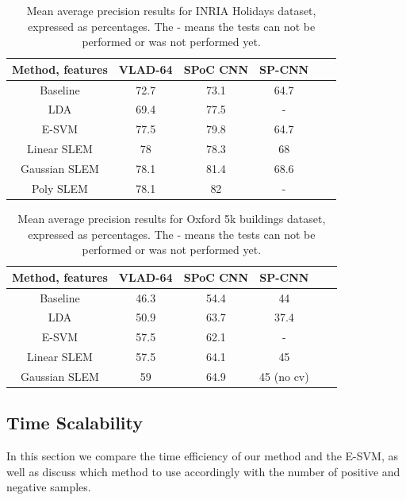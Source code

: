 \begin{table}[t]
\begin{center}
\begin{tabular}{|c|c|c|c|c|c|}
\hline
Method, features & VLAD-64 \cite{VLAD}& SPoC CNN \cite{babenko15} &  SP-CNN \cite{SPPCNN} \\
\hline\hline
Baseline            & 72.7  & 73.1 & 64.7\\
LDA                 & 69.4 & 77.5 & -\\
E-SVM               & 77.5 & 79.8 & 64.7 \\
Linear SLEM         & 78   & 78.3 & 68 \\
Gaussian SLEM       & 78.1 & 81.4 & 68.6 \\
Poly SLEM           & 78.1 &  82   &   -   \\
\hline
\end{tabular}
\end{center}
\caption{Mean average precision results for INRIA Holidays dataset, expressed as percentages. The - means the tests can not be performed or was not performed yet.}
\end{table}


\begin{table}[t]
\begin{center}
\begin{tabular}{|c|c|c|c|c|c|}
\hline
Method, features & VLAD-64 \cite{VLAD} & SPoC CNN \cite{babenko15} &  SP-CNN \cite{SPPCNN} \\
\hline\hline
Baseline            & 46.3 & 54.4 & 44 \\
LDA                 & 50.9 & 63.7 & 37.4\\
E-SVM               & 57.5  & 62.1 & - \\
Linear SLEM         & 57.5  & 64.1 & 45 \\
Gaussian SLEM       & 59    & 64.9 & 45 (no cv) \\
\hline
\end{tabular}
\end{center}
\caption{Mean average precision results for Oxford 5k buildings dataset, expressed as percentages. The - means the tests can not be performed or was not performed yet.}
\end{table}


\subsection{Time Scalability} \label{time-scale}
In this section we compare the time efficiency of our method and the E-SVM, as well as discuss which method to use accordingly with the number of positive and negative samples.

